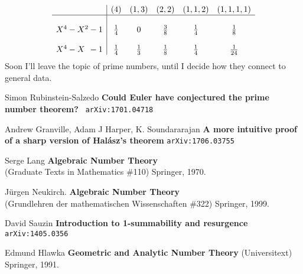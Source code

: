 \documentclass[12pt]{article}
\begin{document}
$$ \begin{array}{l|ccccc}
 & (4) & (1, 3) & (2,2) & (1,1,2) & (1,1,1,1 ) \\ \hline \\
X^4 - X^2 - 1 & \frac{1}{4} & 0 & \frac{3}{8} & \frac{1}{4} & \frac{1}{8} \\\\
X^4 - X \,\;- 1 & \frac{1}{4} &\frac{1}{3} & \frac{1}{8} & \frac{1}{4} & \frac{1}{24}
\end{array} $$
Soon I'll leave the topic of prime numbers, until I decide how they connect to general data. 

\vfill


\begin{thebibliography}{}

\item Simon Rubinstein-Salzedo \textbf{Could Euler have conjectured the prime number theorem?} \texttt{ arXiv:1701.04718}
\item Andrew Granville, Adam J Harper, K. Soundararajan \textbf{A more intuitive proof of a sharp version of Hal\'{a}sz's theorem} \texttt{arXiv:1706.03755}

\item Serge Lang \textbf{Algebraic Number Theory} \\
(Graduate Texts in Mathematics \#110) Springer, 1970.

\item J\"{u}rgen Neukirch. \textbf{Algebraic Number Theory} \\ (Grundlehren der mathematischen Wissenschaften \#322) Springer, 1999.

\item David Sauzin \textbf{Introduction to 1-summability and resurgence} \texttt{arXiv:1405.0356}

\item Edmund Hlawka \textbf{Geometric and Analytic Number Theory} (Universitext) Springer, 1991.

\end{thebibliography}
\end{document}
